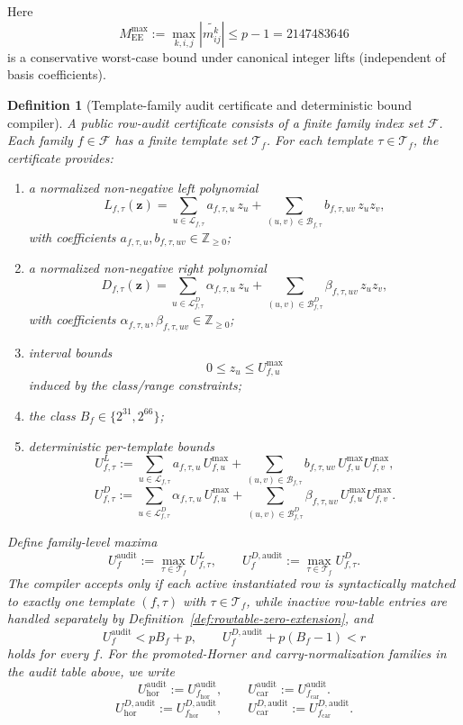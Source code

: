 ﻿\documentclass[11pt]{article}
\newtheorem{definition}[theorem]{Definition}
\newcommand{\Z}{\mathbb{Z}}
\begin{document}
Here
\[
M_{\mathrm{EE}}^{\max}
:=
\max_{k,i,j}\left|\widetilde{m_{ij}^k}\right|
\le
p-1
=
2147483646
\]
is a conservative worst-case bound under canonical integer lifts (independent
of basis coefficients).

\begin{definition}[Template-family audit certificate and deterministic bound compiler]
\label{def:template-audit-certificate}
A public row-audit certificate consists of a finite family index set
\(\mathcal F\). Each family \(f\in\mathcal F\) has a finite template set
\(\mathcal T_f\). For each template \(\tau\in\mathcal T_f\), the certificate
provides:
\begin{enumerate}[label=(\roman*),leftmargin=2em]
    \item a normalized non-negative left polynomial
    \[
    L_{f,\tau}(\mathbf z)
    =
    \sum_{u\in\mathcal L_{f,\tau}} a_{f,\tau,u}\,z_u
    +
    \sum_{(u,v)\in\mathcal B_{f,\tau}} b_{f,\tau,uv}\,z_u z_v,
    \]
    with coefficients \(a_{f,\tau,u},b_{f,\tau,uv}\in\Z_{\ge 0}\);
    \item a normalized non-negative right polynomial
    \[
    D_{f,\tau}(\mathbf z)
    =
    \sum_{u\in\mathcal L^D_{f,\tau}} \alpha_{f,\tau,u}\,z_u
    +
    \sum_{(u,v)\in\mathcal B^D_{f,\tau}} \beta_{f,\tau,uv}\,z_u z_v,
    \]
    with coefficients \(\alpha_{f,\tau,u},\beta_{f,\tau,uv}\in\Z_{\ge 0}\);
    \item interval bounds
    \[
    0 \le z_u \le U_{f,u}^{\max}
    \]
    induced by the class/range constraints;
    \item the class \(B_f\in\{2^{31},2^{66}\}\);
    \item deterministic per-template bounds
    \[
    U_{f,\tau}^{L}
    :=
    \sum_{u\in\mathcal L_{f,\tau}} a_{f,\tau,u}\,U_{f,u}^{\max}
    +
    \sum_{(u,v)\in\mathcal B_{f,\tau}} b_{f,\tau,uv}\,U_{f,u}^{\max}U_{f,v}^{\max},
    \]
    \[
    U_{f,\tau}^{D}
    :=
    \sum_{u\in\mathcal L^D_{f,\tau}} \alpha_{f,\tau,u}\,U_{f,u}^{\max}
    +
    \sum_{(u,v)\in\mathcal B^D_{f,\tau}} \beta_{f,\tau,uv}\,U_{f,u}^{\max}U_{f,v}^{\max}.
    \]
\end{enumerate}
Define family-level maxima
\[
U_f^{\mathrm{audit}}
:=
\max_{\tau\in\mathcal T_f} U_{f,\tau}^{L},
\qquad
U_f^{D,\mathrm{audit}}
:=
\max_{\tau\in\mathcal T_f} U_{f,\tau}^{D}.
\]
The compiler accepts only if each active instantiated row is syntactically
matched to exactly one template \((f,\tau)\) with \(\tau\in\mathcal T_f\),
while inactive row-table entries are handled separately by
Definition~\ref{def:rowtable-zero-extension}, and
\[
U_f^{\mathrm{audit}} < pB_f + p,
\qquad
U_f^{D,\mathrm{audit}} + p(B_f-1) < r
\]
holds for every \(f\). For the promoted-Horner and carry-normalization
families in the audit table above, we write
\[
U_{\mathrm{hor}}^{\mathrm{audit}}
:=
U_{f_{\mathrm{hor}}}^{\mathrm{audit}},
\qquad
U_{\mathrm{car}}^{\mathrm{audit}}
:=
U_{f_{\mathrm{car}}}^{\mathrm{audit}}.
\]
\[
U_{\mathrm{hor}}^{D,\mathrm{audit}}
:=
U_{f_{\mathrm{hor}}}^{D,\mathrm{audit}},
\qquad
U_{\mathrm{car}}^{D,\mathrm{audit}}
:=
U_{f_{\mathrm{car}}}^{D,\mathrm{audit}}.
\]
\end{definition}
\end{document}

